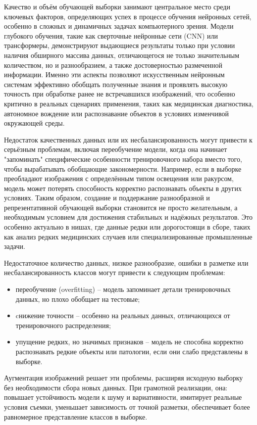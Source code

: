 Качество и объём обучающей выборки занимают центральное место среди ключевых факторов, определяющих успех в процессе обучения нейронных сетей, особенно в сложных и динамичных задачах компьютерного зрения. Модели глубокого обучения, такие как сверточные нейронные сети (CNN) или трансформеры, демонстрируют выдающиеся результаты только при условии наличия обширного массива данных, отличающегося не только значительным количеством, но и разнообразием, а также достоверностью размеченной информации. Именно эти аспекты позволяют искусственным нейронным системам эффективно обобщать полученные знания и проявлять высокую точность при обработке ранее не встречавшихся изображений, что особенно критично в реальных сценариях применения, таких как медицинская диагностика, автономное вождение или распознавание объектов в условиях изменчивой окружающей среды.

Недостаток качественных данных или их несбалансированность могут привести к серьёзным проблемам, включая переобучение модели, когда она начинает "запоминать" специфические особенности тренировочного набора вместо того, чтобы вырабатывать обобщающие закономерности. Например, если в выборке преобладают изображения с определённым типом освещения или ракурсом, модель может потерять способность корректно распознавать объекты в других условиях. Таким образом, создание и поддержание разнообразной и репрезентативной обучающей выборки становится не просто желательным, а необходимым условием для достижения стабильных и надёжных результатов. Это особенно актуально в нишах, где данные редки или дорогостоящи в сборе, таких как анализ редких медицинских случаев или специализированные промышленные задачи.


Недостаточное количество данных, низкое разнообразие, ошибки в разметке или несбалансированность классов могут привести к следующим проблемам:

\begin{itemize}
	\item переобучение (overfitting) – модель запоминает детали тренировочных данных, но плохо обобщает на тестовые;
	\item cнижение точности – особенно на реальных данных, отличающихся от тренировочного распределения;
	\item упущение редких, но значимых признаков – модель не способна корректно распознавать редкие объекты или патологии, если они слабо представлены в выборке.
\end{itemize}

Аугментация изображений решает эти проблемы, расширяя исходную выборку без необходимости сбора новых данных. При грамотной реализации, она: повышает устойчивость модели к шуму и вариативности, имитирует реальные условия съемки, уменьшает зависимость от точной разметки, обеспечивает более равномерное представление классов в выборке.

